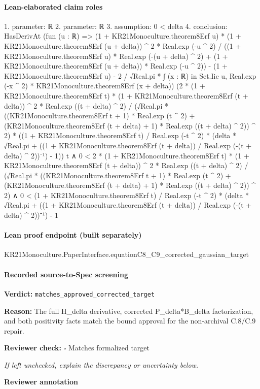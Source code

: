 \documentclass[10pt]{article}
\newcommand{\reviewerbox}{%
  \par\noindent\fbox{\parbox{0.96\linewidth}{\rule{0pt}{0.38in}}}\par
}
\newcommand{\reviewmatch}[1]{%
  \par\noindent\textbf{Reviewer check:} $\square$\; #1\par
  \noindent\emph{If left unchecked, explain the discrepancy or uncertainty below.}\par
}
\begin{document}
\paragraph{Lean-elaborated claim roles}\begin{ReviewVerbatim}
1. parameter: ℝ
2. parameter: ℝ
3. assumption: 0 < delta
4. conclusion: HasDerivAt
    (fun (u : ℝ) =>
      (1 + KR21Monoculture.theorem8Erf u) * (1 + KR21Monoculture.theorem8Erf (u + delta)) ^ 2 * Real.exp (-u ^ 2) /
            ((1 + KR21Monoculture.theorem8Erf u) * Real.exp (-(u + delta) ^ 2) +
              (1 + KR21Monoculture.theorem8Erf (u + delta)) * Real.exp (-u ^ 2)) -
          (1 + KR21Monoculture.theorem8Erf u) -
        2 / √Real.pi * ∫ (x : ℝ) in Set.Iic u, Real.exp (-x ^ 2) * KR21Monoculture.theorem8Erf (x + delta))
    (2 * (1 + KR21Monoculture.theorem8Erf t) * (1 + KR21Monoculture.theorem8Erf (t + delta)) ^ 2 *
          Real.exp ((t + delta) ^ 2) /
        (√Real.pi *
          ((KR21Monoculture.theorem8Erf t + 1) * Real.exp (t ^ 2) +
              (KR21Monoculture.theorem8Erf (t + delta) + 1) * Real.exp ((t + delta) ^ 2)) ^
            2) *
      ((1 + KR21Monoculture.theorem8Erf t) / Real.exp (-t ^ 2) *
          (delta * √Real.pi + ((1 + KR21Monoculture.theorem8Erf (t + delta)) / Real.exp (-(t + delta) ^ 2))⁻¹) -
        1))
    t ∧
  0 <
      2 * (1 + KR21Monoculture.theorem8Erf t) * (1 + KR21Monoculture.theorem8Erf (t + delta)) ^ 2 *
          Real.exp ((t + delta) ^ 2) /
        (√Real.pi *
          ((KR21Monoculture.theorem8Erf t + 1) * Real.exp (t ^ 2) +
              (KR21Monoculture.theorem8Erf (t + delta) + 1) * Real.exp ((t + delta) ^ 2)) ^
            2) ∧
    0 <
      (1 + KR21Monoculture.theorem8Erf t) / Real.exp (-t ^ 2) *
          (delta * √Real.pi + ((1 + KR21Monoculture.theorem8Erf (t + delta)) / Real.exp (-(t + delta) ^ 2))⁻¹) -
        1
\end{ReviewVerbatim}

\paragraph{Lean proof endpoint (built separately)}\begin{ReviewVerbatim}
KR21Monoculture.PaperInterface.equationC8_C9_corrected_gaussian_target
\end{ReviewVerbatim}

\paragraph{Recorded source-to-Spec screening}
\textbf{Verdict:} \texttt{matches\_approved\_corrected\_target}
\\
{\raggedright
\textbf{Reason:} The full H\_\allowbreak{}delta derivative, corrected P\_\allowbreak{}delta*B\_\allowbreak{}delta factorization, and both positivity facts match the bound approval for the non-\allowbreak{}archival C.\allowbreak{}8/\allowbreak{}C.\allowbreak{}9 repair.\allowbreak{}
\par}
\reviewmatch{Matches formalized target}
\noindent\textbf{Reviewer annotation}\par
\reviewerbox
\clearpage
\hypertarget{source-claim-7a440699a84fb997}{}
\end{document}
